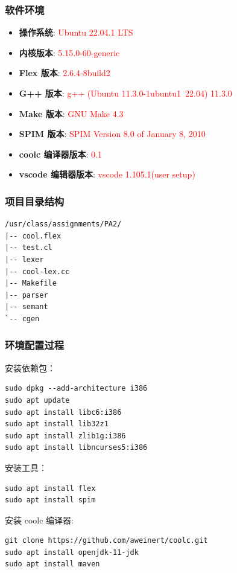 \documentclass[twocolumn]{article}
\begin{document}
\subsubsection{软件环境}
\begin{itemize}
    \item \textbf{操作系统}: \textcolor{red}{Ubuntu 22.04.1 LTS}
    \item \textbf{内核版本}: \textcolor{red}{5.15.0-60-generic}
    \item \textbf{Flex 版本}: \textcolor{red}{2.6.4-8build2}
    \item \textbf{G++ 版本}: \textcolor{red}{g++ (Ubuntu 11.3.0-1ubuntu1~22.04) 11.3.0}
    \item \textbf{Make 版本}: \textcolor{red}{GNU Make 4.3}
    \item \textbf{SPIM 版本}: \textcolor{red}{SPIM Version 8.0 of January 8, 2010}
    \item \textbf{coolc 编译器版本}: \textcolor{red}{0.1}
    \item \textbf{vscode 编辑器版本}: \textcolor{red}{vscode 1.105.1(user setup)}
\end{itemize}

\subsubsection{项目目录结构}
\begin{verbatim}
/usr/class/assignments/PA2/
|-- cool.flex       
|-- test.cl           
|-- lexer             
|-- cool-lex.cc       
|-- Makefile           
|-- parser             
|-- semant            
`-- cgen              
\end{verbatim}

\subsubsection{环境配置过程}

安装依赖包：
\begin{verbatim}
sudo dpkg --add-architecture i386 
sudo apt update 
sudo apt install libc6:i386 
sudo apt install lib32z1 
sudo apt install zlib1g:i386 
sudo apt install libncurses5:i386
\end{verbatim}

安装工具：
\begin{verbatim}
sudo apt install flex
sudo apt install spim
\end{verbatim}

安装 coolc 编译器:
\begin{verbatim}
git clone https://github.com/aweinert/coolc.git
sudo apt install openjdk-11-jdk
sudo apt install maven
\end{verbatim}
\end{document}
